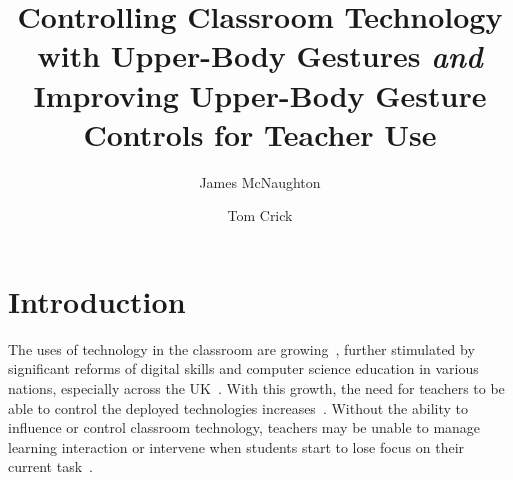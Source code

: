 \documentclass[manuscript, review, screen]{acmart}
\begin{document}
\title{Controlling Classroom Technology with Upper-Body Gestures
  {\emph{and}} Improving Upper-Body Gesture Controls for Teacher Use}

\author{James McNaughton}
\author{Tom Crick}

\renewcommand\shortauthors{McNaughton, J. and Crick, T.}


\begin{abstract}


\end{abstract}


\maketitle

\section{Introduction}
\label{sec:intro}

The uses of technology in the classroom are
growing~\cite{Schrum2008,Lloyd2011,Robertson2012,mcnaughton-et-al:jce2017},
further stimulated by significant reforms of digital skills and computer science education in various nations, especially across the UK~\cite{brown-et-al:toce2014}.
With this growth, the need for teachers to be able to control the deployed technologies increases~\cite{Apple1990,Selwyn2010,Selwyn2011}.
Without the ability to influence or control classroom technology, teachers may be unable to manage learning interaction or intervene when students start to lose focus on their current task~\cite{Chen2005,Karabenick2011}.
\end{document}

